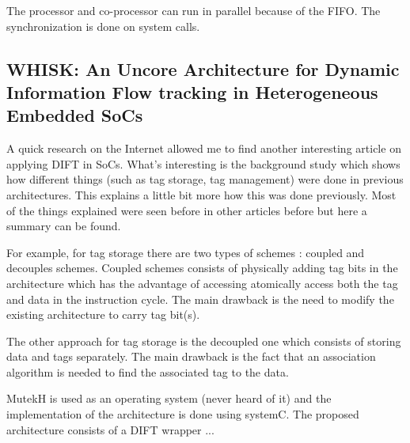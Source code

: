 \documentclass[10pt,a4paper, oneside]{memoir}
\begin{document}
The processor and co-processor can run in parallel because of the FIFO. The synchronization is done on system calls. 

\subsection{WHISK: An Uncore Architecture for Dynamic Information Flow tracking in Heterogeneous Embedded SoCs \cite{Porquet:2013:WUA:2555692.2555696}}
A quick research on the Internet allowed me to find another interesting article on applying DIFT in SoCs. What's interesting is the background study which shows how different things (such as tag storage, tag management) were done in previous architectures. This explains a little bit more how this was done previously. Most of the things explained were seen before in other articles before but here a summary can be found.

For example, for tag storage there are two types of schemes : coupled and decouples schemes. Coupled schemes consists of physically adding tag bits in the architecture which has the advantage of accessing atomically access both the tag and data in the instruction cycle. The main drawback is the need to modify the existing architecture to carry tag bit(s). 

The other approach for tag storage is the decoupled one which consists of storing data and tags separately. The main drawback is the fact that an association algorithm is needed to find the associated tag to the data.

MutekH is used as an operating system (never heard of it) and the implementation of the architecture is done using systemC. The proposed architecture consists of a DIFT wrapper ...





\end{document}
